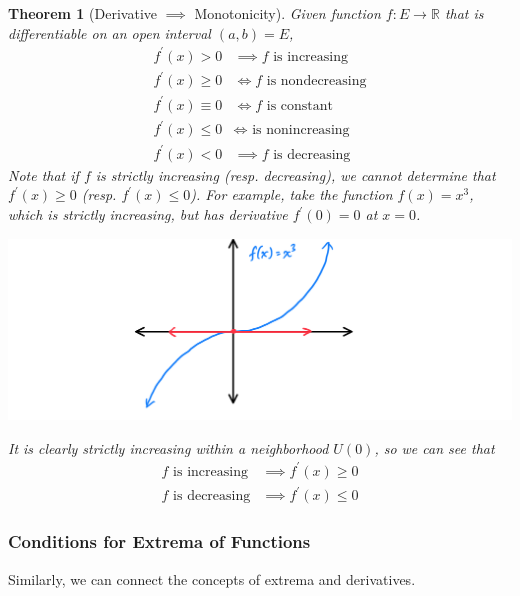 \documentclass{article}
\newtheorem{theorem}{Theorem}[section]
\theoremstyle{remark}
\theoremstyle{definition}
\begin{document}
\begin{theorem}[Derivative $\implies$ Monotonicity]
Given function $f: E \longrightarrow \mathbb{R}$ that is differentiable on an open interval $(a, b) = E$, 
\begin{align*}
    f^\prime (x) > 0 & \implies f \text{ is increasing} \\
    f^\prime (x) \geq 0 & \iff f \text{ is nondecreasing} \\
    f^\prime (x) \equiv 0 & \iff f \text{ is constant} \\
    f^\prime (x) \leq 0 & \iff \text{ is nonincreasing} \\
    f^\prime (x) < 0 & \implies f \text{ is decreasing} 
\end{align*}
Note that if $f$ is strictly increasing (resp. decreasing), we cannot determine that $f^\prime(x) \geq 0$ (resp. $f^\prime (x) \leq 0$). For example, take the function $f(x) = x^3$, which is strictly increasing, but has derivative $f^\prime (0) = 0$ at $x = 0$. 
\begin{center}
    \includegraphics[scale=0.3]{img/Monotonicity_Counterexample_x3.PNG}
\end{center}
It is clearly strictly increasing within a neighborhood $U(0)$, so we can see that
\begin{align*}
    f \text{ is increasing} & \implies f^\prime (x) \geq 0 \\
    f \text{ is decreasing} & \implies f^\prime (x) \leq 0
\end{align*}
\end{theorem}


\subsubsection{Conditions for Extrema of Functions}
Similarly, we can connect the concepts of extrema and derivatives. 
\end{document}

